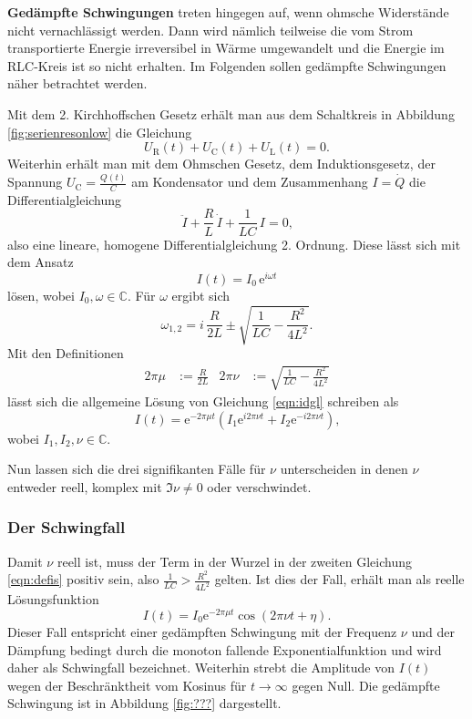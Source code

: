 \textbf{Gedämpfte Schwingungen} treten hingegen auf, wenn ohmsche Widerstände nicht vernachlässigt werden. 
Dann wird nämlich teilweise die vom Strom transportierte Energie irreversibel in Wärme 
umgewandelt und die Energie im RLC-Kreis ist so nicht erhalten. Im Folgenden sollen gedämpfte 
Schwingungen näher betrachtet werden.

Mit dem 2. Kirchhoffschen Gesetz erhält man aus dem Schaltkreis in Abbildung \ref{fig:serienresonlow} die Gleichung
\begin{equation*}
	U_{\text{R}}(t) + U_{\text{C}}(t) + U_{\text{L}}(t) = 0 \text{.}
\end{equation*}
Weiterhin erhält man mit dem Ohmschen Gesetz, dem Induktionsgesetz, der Spannung $U_{\text{C}} = \frac{Q(t)}{C}$ am Kondensator und dem Zusammenhang $I = \dot{Q}$ die Differentialgleichung
\begin{equation}
	\ddot{I} + \frac{R}{L} \, \dot{I} + \frac{1}{LC} \, I = 0 \text{,}
	\label{eqn:idgl}
\end{equation}
also eine lineare, homogene Differentialgleichung 2. Ordnung.
Diese lässt sich mit dem Ansatz 
\begin{equation}
	I(t) = I_0 \, \mathrm{e}^{i \omega t}
\end{equation}
lösen, wobei $I_0, \omega \in \mathbb{C}$.
Für $\omega$ ergibt sich
\begin{equation}
	\omega_{1,2} = i \, \frac{R}{2L} \pm \sqrt{\frac{1}{LC} - \frac{R^2}{4L^2}} \text{.}
\end{equation}
Mit den Definitionen
\begin{align}
	2 \pi \mu &:= \frac{R}{2L} & 2 \pi \nu &:= \sqrt{\frac{1}{LC} - \frac{R^2}{4L^2}}
	\label{eqn:defis}
\end{align}
lässt sich die allgemeine Lösung von Gleichung \eqref{eqn:idgl} schreiben als
\begin{equation}
	I(t) = \mathrm{e}^{-2 \pi \mu t} (I_1 \mathrm{e}^{i 2 \pi \nu t} + I_2 \mathrm{e}^{-i 2 \pi \nu t}) \text{,}
\end{equation}
wobei $I_1, I_2, \nu \in \mathbb{C}$.

Nun lassen sich die drei signifikanten Fälle für $\nu$ unterscheiden in denen $\nu$ entweder reell, komplex mit $\Im \nu \neq 0$ oder verschwindet.

\subsubsection{Der Schwingfall}
Damit $\nu$ reell ist, muss der Term in der Wurzel in der zweiten Gleichung \eqref{eqn:defis} 
positiv sein, also $\frac{1}{LC} > \frac{R^2}{4L^2}$ gelten.
Ist dies der Fall, erhält man als reelle Lösungsfunktion
\begin{equation}
	I(t) = I_0 \mathrm{e}^{-2 \pi \mu t} \cos(2\pi \nu t + \eta) \text{.}
	\label{eqn:schwingi}
\end{equation}
Dieser Fall entspricht einer gedämpften Schwingung mit der Frequenz $\nu$ und der Dämpfung
bedingt durch die monoton fallende Exponentialfunktion und wird daher als Schwingfall bezeichnet.
Weiterhin strebt die Amplitude von $I(t)$ wegen der Beschränktheit vom Kosinus für $t \to \infty$ gegen Null.
Die gedämpfte Schwingung ist in Abbildung \ref{fig:???} dargestellt.

